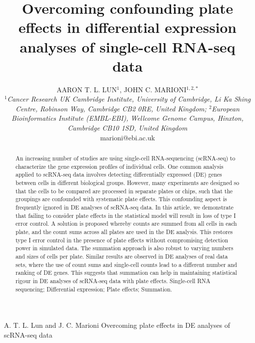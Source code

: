 \documentclass[oupdraft]{bio}
\begin{document}
\title{Overcoming confounding plate effects in differential expression analyses of single-cell RNA-seq data}

\author{AARON T. L. LUN$^1$, JOHN C. MARIONI$^{1,2,\ast}$ \\[4pt]
    \textit{$^1$Cancer Research UK Cambridge Institute, University of Cambridge, Li Ka Shing Centre, Robinson Way, Cambridge CB2 0RE, United Kingdom;
$^2$European Bioinformatics Institute (EMBL-EBI), Wellcome Genome Campus, Hinxton, Cambridge CB10 1SD, United Kingdom}
    \\[2pt]
{marioni@ebi.ac.uk}}

\markboth%
{A. T. L. Lun and J. C. Marioni}
{Overcoming plate effects in DE analyses of scRNA-seq data}

\maketitle


\begin{abstract}{
An increasing number of studies are using single-cell RNA-sequencing (scRNA-seq) to characterize the gene expression profiles of individual cells.
One common analysis applied to scRNA-seq data involves detecting differentially expressed (DE) genes between cells in different biological groups.
However, many experiments are designed so that the cells to be compared are processed in separate plates or chips, 
    such that the groupings are confounded with systematic plate effects.
This confounding aspect is frequently ignored in DE analyses of scRNA-seq data.
In this article, we demonstrate that failing to consider plate effects in the statistical model will result in loss of type I error control.
A solution is proposed whereby counts are summed from all cells in each plate, and the count sums across all plates are used in the DE analysis.
This restores type I error control in the presence of plate effects without compromising detection power in simulated data.
The summation approach is also robust to varying numbers and sizes of cells per plate.
Similar results are observed in DE analyses of real data sets, where the use of count sums and single-cell counts lead to a different number and ranking of DE genes.
This suggests that summation can help in maintaining statistical rigour in DE analyses of scRNA-seq data with plate effects.
}
{Single-cell RNA sequencing; Differential expression; Plate effects; Summation.}
\end{abstract}
\end{document}
